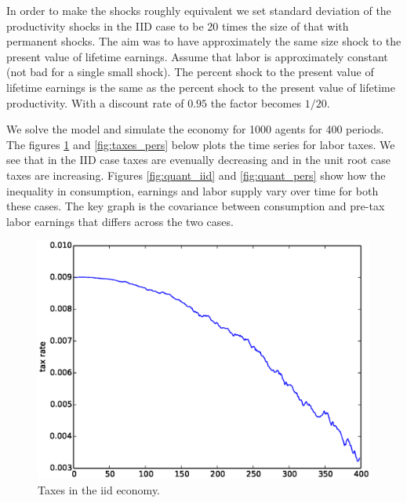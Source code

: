 \documentclass[thmsb,11pt]{article}
\begin{document}
In order to make the shocks roughly equivalent we set standard deviation of the productivity shocks in the IID case to be 20 times the size of that with permanent shocks. The aim was to have approximately the same size shock to the present value of lifetime earnings.  Assume that labor is approximately constant (not bad for a single small shock).  The percent shock to the present value of lifetime earnings is the same as the percent shock to the present value of lifetime productivity.  With a discount rate of $0.95$ the factor becomes $1/20$.


We solve the model and simulate the economy for 1000 agents for 400 periods. The figures \ref{fig:taxes_iid} and \ref{fig:taxes_pers}  below plots the time series for labor taxes. We see that in the IID case taxes are evenually decreasing and in the unit root case taxes are increasing. Figures \ref{fig:quant_iid} and \ref{fig:quant_pers} show how the inequality in consumption, earnings and labor supply vary over time for both these cases. The key graph is the covariance between consumption and pre-tax labor earnings that differs across the two cases.



  \begin{figure}[htp]
 \centering
 \includegraphics[width=\textwidth]{tax_iid.eps}
 \caption{Taxes in the iid economy.}
 \label{fig:taxes_iid}
 \end{figure}
\end{document}
